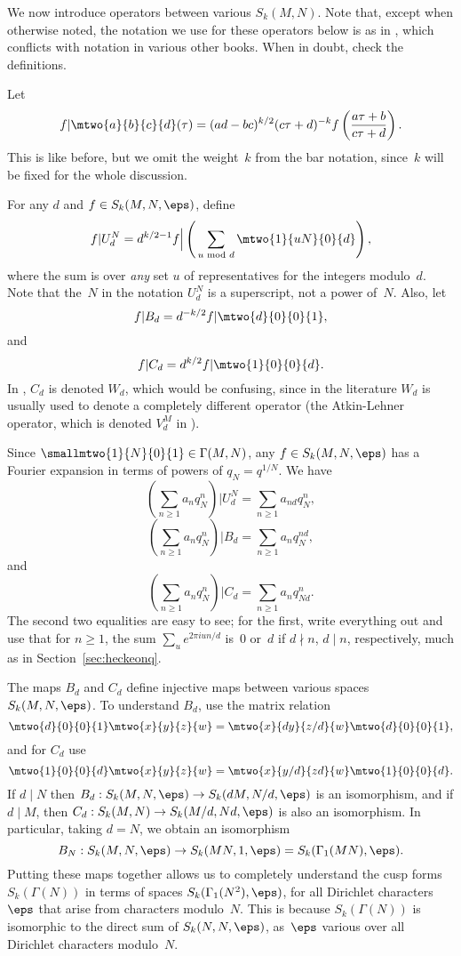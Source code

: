 \documentclass{report}
\begin{document}
We now introduce operators between various $S_k(M,N)$.  Note that,
except when otherwise noted, the notation we use for these
operators below is as in \cite{winnie:newforms}, which conflicts
with notation in various other books.  When in doubt, check the
definitions.

Let
\[
  f|\mtwo{a}{b}{c}{d}(\tau) = (ad-bc)^{k/2} (c\tau+d)^{-k}
  f\left(\frac{a\tau+b}{c\tau+d}\right).
\]
This is like before, but we omit the weight~$k$ from the bar notation,
since~$k$ will be fixed for the whole discussion.

For any $d$ and $f\in S_k(M,N,\eps)$, define
\[
  f|U_d^N = d^{k/2-1} f \Big| \left(\,\sum_{u \text{ mod } d}
  \mtwo{1}{uN}{0}{d}\right),
\]
where the sum is over {\em any} set $u$ of representatives
for the integers modulo~$d$.
Note that the~$N$ in the notation $U_d^N$ is a superscript, not a power
of~$N$. Also, let
\[
  f|B_d = d^{-k/2} f|\mtwo{d}{0}{0}{1},
\]
and
\[
  f|C_d = d^{k/2} f|\mtwo{1}{0}{0}{d}.
\]
In \cite{winnie:newforms}, $C_d$ is denoted $W_d$, which would be confusing,
since in the literature $W_d$ is usually used to denote a completely different
operator (the Atkin-Lehner operator, which is denoted $V_d^M$ in \cite{winnie:newforms}).


Since $\smallmtwo{1}{N}{0}{1}\in\Gamma(M,N)$, any $f\in S_k(M,N,\eps)$
has a Fourier expansion in terms of powers of $q_N = q^{1/N}$. We
have
\[
   \left(\sum_{n\geq 1} a_n q_N^n\right)|U_d^N = \sum_{n\geq 1} a_{nd} q_N^n,
\]
\[
   \left(\sum_{n\geq 1} a_n q_N^n\right)|B_d = \sum_{n\geq 1} a_{n} q_N^{nd},
\]
and
\[
   \left(\sum_{n\geq 1} a_n q_N^n\right)|C_d = \sum_{n\geq 1} a_{n} q_{Nd}^{n}.
\]
The second two equalities are easy to see; for the first, write
everything out and use that for $n\geq 1$,
the sum $\sum_{u} e^{2\pi i un/d}$ is~$0$ or~$d$
if $d\nmid n$, $d\mid n$, respectively, much as
in Section~\ref{sec:heckeonq}.

The maps $B_d$ and $C_d$ define injective maps between various
spaces $S_k(M,N,\eps)$.  To understand $B_d$, use the matrix
relation
\[
  \mtwo{d}{0}{0}{1} \mtwo{x}{y}{z}{w}  = \mtwo{x}{dy}{z/d}{w}
  \mtwo{d}{0}{0}{1},
\]
and for $C_d$ use
\[
  \mtwo{1}{0}{0}{d} \mtwo{x}{y}{z}{w}  = \mtwo{x}{y/d}{zd}{w}
  \mtwo{1}{0}{0}{d}.
\]
If $d\mid N$ then $B_d:S_k(M,N,\eps)\to S_k(dM,N/d,\eps)$ is an
isomorphism, and if $d\mid M$, then $C_d:S_k(M,N)\to
S_k(M/d,Nd,\eps)$ is also an isomorphism. In particular, taking
$d=N$, we obtain an isomorphism
\begin{equation}\label{eqn:bniso}
  B_N:S_k(M,N,\eps)\to S_k(MN,1,\eps) = S_k(\Gamma_1(MN),\eps).
\end{equation}
Putting these maps together allows us to completely understand the
cusp forms $S_k(\Gamma(N))$ in terms of spaces
$S_k(\Gamma_1(N^2),\eps)$, for all Dirichlet characters $\eps$ that
arise from characters modulo~$N$.
This is because
$S_k(\Gamma(N))$ is isomorphic to the direct sum of
$S_k(N,N,\eps)$, as~$\eps$ various over all Dirichlet characters
modulo~$N$.
\end{document}
